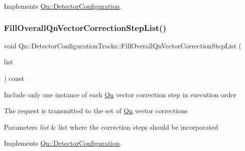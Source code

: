 Implements \mbox{\hyperlink{classQn_1_1DetectorConfiguration_a76e173f938b886b5575597d9464698b4}{Qn\+::\+Detector\+Configuration}}.

\mbox{\label{classQn_1_1DetectorConfigurationTracks_a4e725e8d949ab829c804b4e5d9323ff6}} 
\subsubsection{\texorpdfstring{Fill\+Overall\+Qn\+Vector\+Correction\+Step\+List()}{FillOverallQnVectorCorrectionStepList()}}
{\footnotesize\ttfamily void Qn\+::\+Detector\+Configuration\+Tracks\+::\+Fill\+Overall\+Qn\+Vector\+Correction\+Step\+List (\begin{DoxyParamCaption}\item[{T\+List $\ast$}]{list }\end{DoxyParamCaption}) const\hspace{0.3cm}{\ttfamily [virtual]}}

Include only one instance of each \mbox{\hyperlink{namespaceQn}{Qn}} vector correction step in execution order

The request is transmitted to the set of \mbox{\hyperlink{namespaceQn}{Qn}} vector corrections 
\begin{DoxyParams}{Parameters}
{\em list} & list where the correction steps should be incorporated \\
\hline
\end{DoxyParams}


Implements \mbox{\hyperlink{classQn_1_1DetectorConfiguration_ad71d83a2b0a5cee45bde15e936843e49}{Qn\+::\+Detector\+Configuration}}.

\mbox{\label{classQn_1_1DetectorConfigurationTracks_ac9b06051e9ec37086f071308e5031b62}} 
